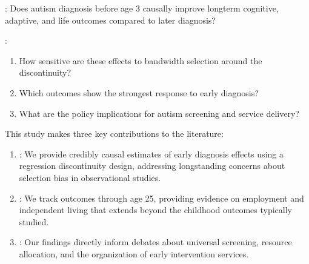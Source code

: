 \documentclass[letterpaper,10pt,english]{jupyterBook}
\begin{document}
\sphinxAtStartPar
{}: Does autism diagnosis before age 3 causally improve long\sphinxhyphen{}term cognitive, adaptive, and life outcomes compared to later diagnosis?

\sphinxAtStartPar
{}:
\begin{enumerate}
%
\item {} 
\sphinxAtStartPar
How sensitive are these effects to bandwidth selection around the discontinuity?

\item {} 
\sphinxAtStartPar
Which outcomes show the strongest response to early diagnosis?

\item {} 
\sphinxAtStartPar
What are the policy implications for autism screening and service delivery?

\end{enumerate}

\begin{DUlineblock}{0em}
\item[] 
\end{DUlineblock}

\sphinxAtStartPar
This study makes three key contributions to the literature:
\begin{enumerate}
%
\item {} 
\sphinxAtStartPar
{}: We provide credibly causal estimates of early diagnosis effects using a regression discontinuity design, addressing longstanding concerns about selection bias in observational studies.

\item {} 
\sphinxAtStartPar
{}: We track outcomes through age 25, providing evidence on employment and independent living that extends beyond the childhood outcomes typically studied.

\item {} 
\sphinxAtStartPar
{}: Our findings directly inform debates about universal screening, resource allocation, and the organization of early intervention services.

\end{enumerate}

\begin{DUlineblock}{0em}
\item[] 
\end{DUlineblock}
\end{document}
